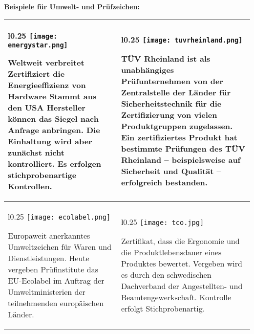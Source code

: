 \documentclass[asp1.tex]{subfiles}
\begin{document}
\textbf{Beispiele für Umwelt- und Prüfzeichen:}

\begin{table}[H]
    \centering
    \begin{tabular}{|p{}|p{}|}
        \hline

        \begin{wrapfigure}{l}{0.25\textwidth}
            \texttt{[image: energystar.png]}
        \end{wrapfigure}

        Weltweit verbreitet
        Zertifiziert die Energieeffizienz von Hardware
        Stammt aus den USA
        Hersteller können das Siegel nach Anfrage anbringen. Die Einhaltung wird aber zunächst nicht kontrolliert.
        Es erfolgen stichprobenartige Kontrollen.

         &

        \begin{wrapfigure}{l}{0.25\textwidth}
            \texttt{[image: tuvrheinland.png]}
        \end{wrapfigure}

        TÜV Rheinland ist als unabhängiges Prüfunternehmen von der Zentralstelle der Länder für Sicherheitstechnik für die Zertifizierung von vielen Produktgruppen zugelassen.
        Ein zertifiziertes Produkt hat bestimmte Prüfungen des TÜV Rheinland – beispielsweise auf Sicherheit und Qualität – erfolgreich bestanden.

        \\\hline

        \begin{wrapfigure}{l}{0.25\textwidth}
            \texttt{[image: ecolabel.png]}
        \end{wrapfigure}

        Europaweit anerkanntes Umweltzeichen für Waren und Dienstleistungen.
        Heute vergeben Prüfinstitute das EU-Ecolabel im Auftrag der Umweltministerien der teilnehmenden europäischen Länder.

         &

        \begin{wrapfigure}{l}{0.25\textwidth}
            \texttt{[image: tco.jpg]}
        \end{wrapfigure}

        Zertifikat, dass die Ergonomie und die Produktlebensdauer eines Produktes bewertet.
        Vergeben wird es durch den schwedischen Dachverband der Angestellten- und Beamtengewerkschaft.
        Kontrolle erfolgt Stichprobenartig.

        \\\hline
    \end{tabular}
\end{table}
\end{document}
